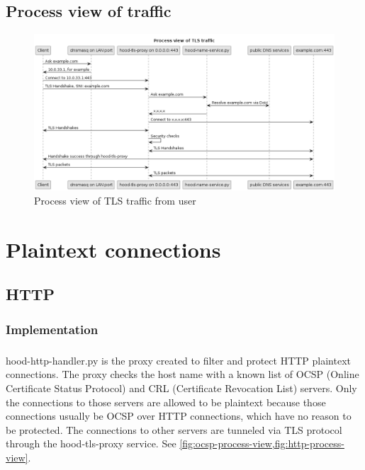 \documentclass[mscthesis]{usiinfthesis}
\begin{document}
\section{Process view of traffic}
\begin{figure}[H]
  \includegraphics[width=\textheight, angle=90]{graphics/puml/process-tls-traffic.png}
  \caption{Process view of TLS traffic from user}
  \label{fig:tls-process-view}
\end{figure}

\chapter{Plaintext connections}

\section{HTTP}
\subsection{Implementation}
\paragraph{}
hood-http-handler.py is the proxy created to filter and protect HTTP plaintext connections. The proxy checks the host name with a known list of OCSP (Online Certificate Status Protocol) and CRL (Certificate Revocation List) servers. Only the connections to those servers are allowed to be plaintext because those connections usually be OCSP over HTTP connections, which have no reason to be protected. The connections to other servers are tunneled via TLS protocol through the hood-tls-proxy service. See \cref{fig:ocsp-process-view,fig:http-process-view}.
\end{document}
